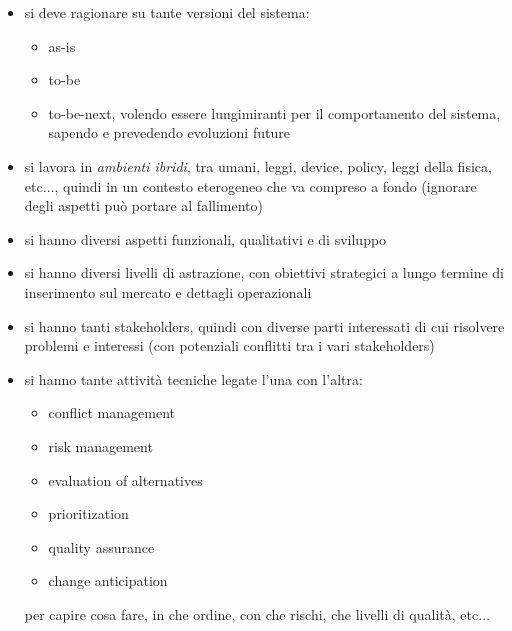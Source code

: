\documentclass[a4paper,12pt, oneside]{book}
\begin{document}
\begin{itemize}
  \item si deve ragionare su tante versioni del sistema:
  \begin{itemize}
    \item as-is
    \item to-be
    \item to-be-next, volendo essere lungimiranti per il comportamento del
    sistema, sapendo e prevedendo evoluzioni future
  \end{itemize}
  \item si lavora in \textit{ambienti ibridi}, tra umani, leggi, device, policy,
  leggi della fisica, etc$\ldots$, quindi in un contesto eterogeneo che va
  compreso a fondo (ignorare degli aspetti può portare al fallimento)
  \item si hanno diversi aspetti funzionali, qualitativi e di sviluppo
  \item si hanno diversi livelli di astrazione, con obiettivi strategici a lungo
  termine di inserimento sul mercato e dettagli operazionali
  \item si hanno tanti stakeholders, quindi con diverse parti interessati di cui
  risolvere problemi e interessi (con potenziali conflitti tra i vari
  stakeholders)
  \item si hanno tante attività tecniche legate l'una con l'altra:
  \begin{itemize}
    \item conflict management
    \item risk management
    \item evaluation of alternatives
    \item prioritization
    \item quality assurance
    \item change anticipation
  \end{itemize}
  per capire cosa fare, in che ordine, con che rischi, che livelli di qualità,
  etc$\ldots$
\end{itemize}
\end{document}
